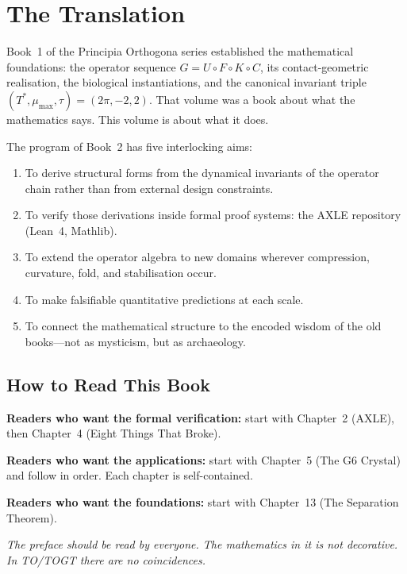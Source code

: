 \documentclass[11pt, twoside, openright]{book}
\theoremstyle{plain}
\theoremstyle{definition}
\begin{document}
\cleardoublepage

\chapter{The Translation}

Book~1 of the Principia Orthogona series established the mathematical
foundations: the operator sequence $G = U \circ F \circ K \circ C$,
its contact-geometric realisation, the biological instantiations, and
the canonical invariant triple $(T^*, \mu_{\max}, \tau) = (2\pi, -2, 2)$.
That volume was a book about what the mathematics says. This volume is
about what it does.

The program of Book~2 has five interlocking aims:
\begin{enumerate}[label=\arabic*., leftmargin=*]
  \item To derive structural forms from the dynamical invariants of the
    operator chain rather than from external design constraints.
  \item To verify those derivations inside formal proof systems: the
    AXLE repository (Lean~4, Mathlib).
  \item To extend the operator algebra to new domains wherever
    compression, curvature, fold, and stabilisation occur.
  \item To make falsifiable quantitative predictions at each scale.
  \item To connect the mathematical structure to the encoded wisdom of
    the old books---not as mysticism, but as archaeology.
\end{enumerate}

\section{How to Read This Book}

\textbf{Readers who want the formal verification:} start with
Chapter~2 (AXLE), then Chapter~4 (Eight Things That Broke).

\textbf{Readers who want the applications:} start with Chapter~5
(The G6 Crystal) and follow in order. Each chapter is self-contained.

\textbf{Readers who want the foundations:} start with
Chapter~13 (The Separation Theorem).

\textit{The preface should be read by everyone. The mathematics in it
is not decorative. In TO/TOGT there are no coincidences.}
\end{document}
